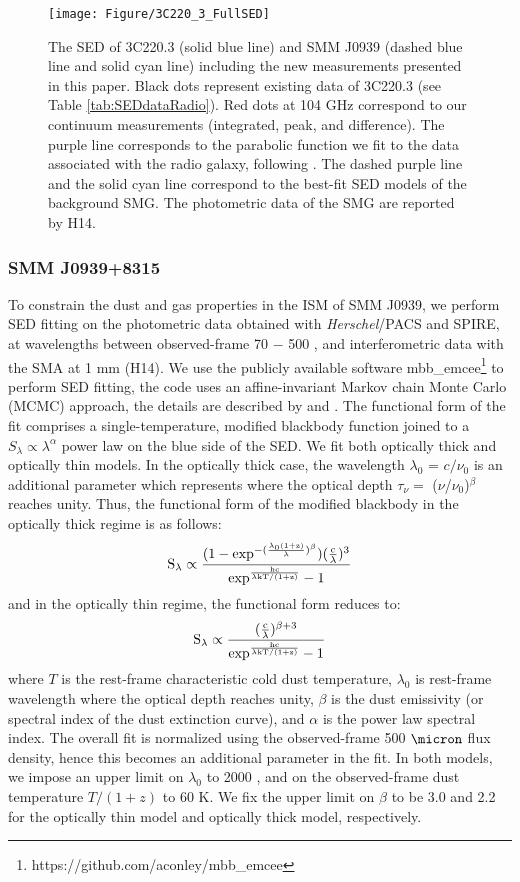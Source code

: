 \documentclass[twocolumn,apj,numberedappendix]{emulateapj}
\begin{document}
\begin{figure}[!tbph]
\centering
\texttt{[image: Figure/3C220\_3\_FullSED]}
\caption{The SED of 3C220.3 (solid blue line) and SMM J0939 (dashed blue line and solid cyan line) including the new measurements presented in this paper. 
Black dots represent existing data of 3C220.3 (see Table \ref{tab:SEDdataRadio}). Red dots at 104 GHz correspond to 
our continuum measurements (integrated, peak, and difference). The purple line corresponds to the parabolic function we 
fit to the data associated with the radio galaxy, following \citet{Cleary07a}. The dashed purple line and 
the solid cyan line correspond to the best-fit SED models of the background SMG. The photometric data of the SMG are reported by H14. \label{fig:SED}}
\end{figure}

\subsubsection{SMM J0939+8315} 
To constrain the dust and gas properties in the ISM of SMM J0939, we perform SED fitting on the
photometric data obtained with {\it Herschel}/PACS and SPIRE, at wavelengths
between observed-frame 70 \micron $-$ 500 \micron, and interferometric data with the SMA at 1 mm (H14). We use the publicly
available software {\sc mbb\_emcee}\footnote{https://github.com/aconley/mbb\_emcee} to perform SED fitting, the code uses an affine-invariant Markov chain Monte
Carlo (MCMC) approach, the details are described by \citet{Riechers13a} and \citet{Dowell14a}. The
functional form of the fit comprises a single-temperature, modified blackbody function joined to a $S_{\lambda} \propto \lambda^\alpha
$ power law on the blue
side of the SED.
We fit both optically thick and optically thin models. In the optically thick case, the wavelength $
\lambda_0$ = ${c}/{\nu_0}$ is an additional parameter which represents where the optical
depth $\tau_{\nu} =$ ($\nu$/$\nu_0$)$^\beta$ reaches unity. Thus, the functional form of the modified blackbody
in the optically thick regime is as follows:
\begin{equation}
\rm S_{\lambda} \propto \frac{(1-exp^{-(\frac{\lambda_0 (1+z)}{\lambda})^{\beta}})(\frac{c}{\lambda})^3}
{exp^{\frac{hc}{\lambda\rm{kT/(1+z)} } }-1}
\end{equation}
and in the optically thin regime, the functional form reduces to:
\begin{equation}
\rm S_{\lambda} \propto \frac{(\frac{c}{\lambda})^{\beta+3}}{exp^{\frac{hc}{\lambda\rm{kT/(1+z)}}}-1}
\end{equation}
where $T$ is the rest-frame characteristic cold dust temperature, $\lambda_0$ is rest-frame wavelength
where the optical depth reaches unity, $\beta$ is the dust emissivity (or spectral index of the dust extinction
curve), and $\alpha$ is the power law spectral index. The overall fit is normalized using the observed-frame 500
$\micron$ flux density, hence this becomes an additional parameter in the fit. In both models, we impose an upper limit on $
\lambda_0$ to 2000 \micron, and on the observed-frame dust temperature $T/(1+z)$ to 60 K. We fix the upper limit on 
$\beta$ to be 3.0 and 2.2 for the optically thin model and optically thick model, respectively.
\end{document}
